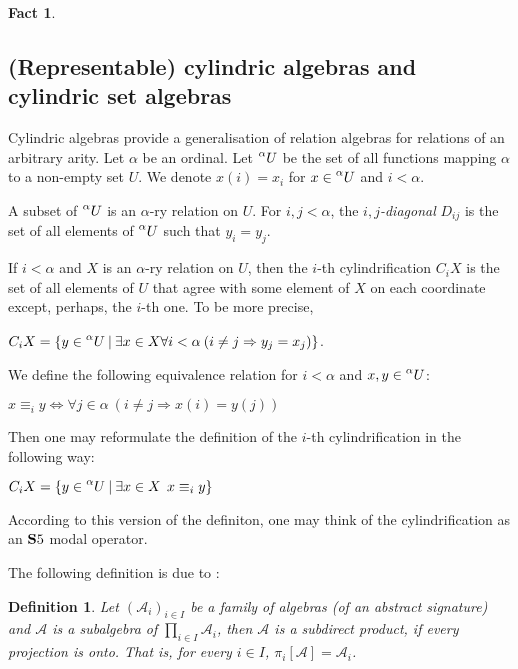 \documentclass[a4paper]{article}
\theoremstyle{defin}
\newtheorem{defin}{Definition}
\theoremstyle{theorem}
\theoremstyle{prop}
\theoremstyle{lemma}
\theoremstyle{fact}
\newtheorem{fact}{Fact}
\theoremstyle{ex}
\theoremstyle{col}
\begin{document}
\begin{fact}
\end{fact}

\subsection{(Representable) cylindric algebras and cylindric set algebras}

Cylindric algebras provide a generalisation of relation algebras for relations of an arbitrary arity. Let $\alpha$ be an ordinal. Let $\prescript{\alpha}{}U$ be the set of all functions mapping $\alpha$ to a non-empty set $U$. We denote $x(i) = x_i$ for
$x \in \prescript{\alpha}{}U$ and $i < \alpha$.

A subset of $\prescript{\alpha}{}U$ is an $\alpha$-ry relation on $U$. For $i, j < \alpha$, the \emph{$i,j$-diagonal} $D_{ij}$ is the set of all elements of $\prescript{\alpha}{}U$ such that $y_i = y_j$.

If $i < \alpha$ and $X$ is an $\alpha$-ry relation on $U$, then
the $i$-th cylindrification $C_i X$ is the set of all elements of $U$ that agree with some element of $X$ on each coordinate except, perhaps, the $i$-th one. To be more precise,
\begin{center}
$C_i X = \{ y \in \prescript{\alpha}{}U \: |
\: \exists x \in X \forall i < \alpha \: (i \neq j \Rightarrow y_j = x_j)\}$.
\end{center}
We define the following equivalence relation for $i < \alpha$ and $x, y \in \prescript{\alpha}{}U$:
\begin{center}
  $x \equiv_i y \Leftrightarrow \forall j \in \alpha \: (i \neq j \Rightarrow x(i) = y(j))$
\end{center}
Then one may reformulate the definition of the $i$-th cylindrification in the following way:

\begin{center}
  $C_i X = \{ y \in \prescript{\alpha}{}U \: | \: \exists x \in X \:\: x \equiv_i y \}$
\end{center}

According to this version of the definiton, one may think of the cylindrification as an ${\bf S}5$ modal operator.

The following definition is due to \cite{sankappanavar1981course}:

\begin{defin}
  Let $(\mathcal{A}_i)_{i \in I}$ be a family of algebras (of an abstract signature) and $\mathcal{A}$ is a subalgebra of $\prod \limits_{i \in I} \mathcal{A}_i$, then $\mathcal{A}$ is a subdirect product, if every projection is onto. That is, for every $i \in I$, $\pi_i[\mathcal{A}] = \mathcal{A}_i$.
\end{defin}
\end{document}
